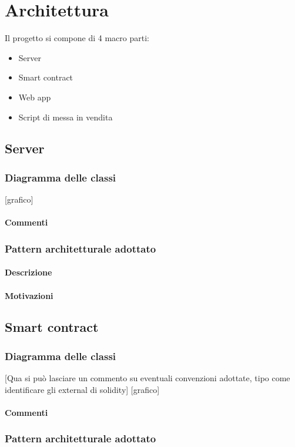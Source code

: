 \documentclass[a4paper, 12pt]{article}
\begin{document}
\section{Architettura}
Il progetto si compone di 4 macro parti:
\begin{itemize}
\item Server
\item Smart contract
\item Web app
\item Script di messa in vendita
\end{itemize}
\subsection{Server}
\subsubsection{Diagramma delle classi}
[grafico]
\paragraph{Commenti}
\subsubsection{Pattern architetturale adottato}
\paragraph{Descrizione}
\paragraph{Motivazioni}

\subsection{Smart contract}
\subsubsection{Diagramma delle classi}
[Qua si può lasciare un commento su eventuali convenzioni adottate, tipo come identificare gli external di solidity]
[grafico]
\paragraph{Commenti}
\subsubsection{Pattern architetturale adottato}
\end{document}
